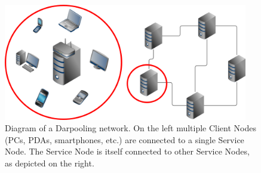 \documentclass[mathserif]{beamer}
\begin{document}
\begin{frame}[plain]
\begin{figure}
\begin{center}
\includegraphics[width=0.95\textwidth]{img/darpooling.png}
\end{center}
\begin{flushleft}
\caption{Diagram of a Darpooling network. On the left multiple Client Nodes
(PCs, PDAs, smartphones, etc.) are connected to a single Service Node.
The Service
Node is itself connected to other Service Nodes, as depicted on the right.
}
\end{flushleft}
\end{figure}
\end{frame}
\end{document}
